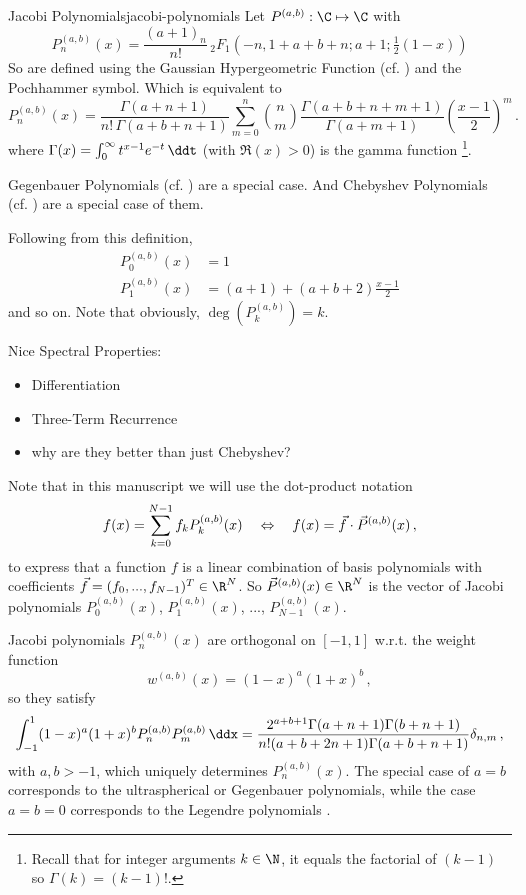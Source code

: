 \begin{definition}{Jacobi Polynomials}{jacobi-polynomials}
  Let $P^{(a, b)}: \C \mapsto \C$ with
  $$P^{(a,b)}_n(x) = {\frac{(a +1)_{n}}{n!}}\,{}_{2}F_{1}\left(-n,1+a +b +n;a +1;{\tfrac  {1}{2}}(1-x)\right)$$
  So are defined using the Gaussian Hypergeometric Function (cf. ) and the Pochhammer symbol.
  Which is equivalent to
  $$P_{n}^{{(a, b)}}(x)={\frac  {\Gamma (a +n+1)}{n!\,\Gamma (a +b +n+1)}}\sum _{{m=0}}^{n}\binom{n}{m}{\frac{\Gamma (a +b +n+m+1)}{\Gamma (a +m+1)}}\left({\frac{x-1}{2}}\right)^{m}\,.$$
  where $\Gamma (x)=\int _{0}^{\infty }t^{x-1}e^{-t}\,\ddt$ (with $\Re(x)>0$) is the gamma function \footnote{Recall that for integer arguments $k \in \N$, it equals the factorial of $(k-1)$ so $\Gamma(k) = (k-1)!$.}.

  Gegenbauer Polynomials (cf. ) are a special case. And
  Chebyshev Polynomials (cf. ) are a special case of them.
\end{definition}

Following from this definition,
\begin{align*}
  P_0^{(a, b)}(x)   & = 1                            \\
  P_{1}^{(a, b)}(x) & = (a+1)+(a+b+2){\frac{x-1}{2}}
\end{align*}
and so on. Note that obviously, $\deg\left(P_k^{(a, b)}\right) = k$.

Nice Spectral Properties:
\begin{itemize}
  \item Differentiation
  \item Three-Term Recurrence
  \item why are they better than just Chebyshev?
\end{itemize}

Note that in this manuscript we will use the dot-product notation
$$f(x) = \sum_{k=0}^{N-1} f_k P_k^{(a, b)}(x) \quad\Leftrightarrow\quad f(x) = \vec{f} \cdot \vec{P}^{(a, b)}(x)\,,$$
to express that a function $f$ is a linear combination of basis polynomials with coefficients $\vec{f} = (f_0, ..., f_{N-1})^T \in \R^N$.
So $\vec{P}^{(a, b)}(x) \in \R^N$ is the vector of Jacobi polynomials $P^{(a, b)}_0(x)$, $P^{(a, b)}_1(x)$, ..., $P^{(a, b)}_{N-1}(x)$.

Jacobi polynomials $P_n^{(a,b)}(x)$ are orthogonal on $[-1,1]$ w.r.t. the weight function
\begin{equation*}
  w^{(a,b)}(x)=(1-x)^a (1+x)^b\,,
\end{equation*}
so they satisfy
\begin{align*}\label{eq:orthogonalityconditionJacobi}
  \int_{-1}^1(1-x)^a(1+x)^bP_n^{(a,b)}P_m^{(a,b)}\,\ddx = \frac{2^{a+b+1} \Gamma (a+n+1) \Gamma (b+n+1)}{n! (a+b+2 n+1) \Gamma (a+b+n+1)} \delta_{n,m}\,,
\end{align*}
with $a	,b>-1$, which uniquely determines $P_n^{(a,b)}(x)$. The special case of $a=b$ corresponds to the ultraspherical or Gegenbauer polynomials, while the case $a=b=0$ corresponds to the Legendre polynomials \cite{2018-nist}.

